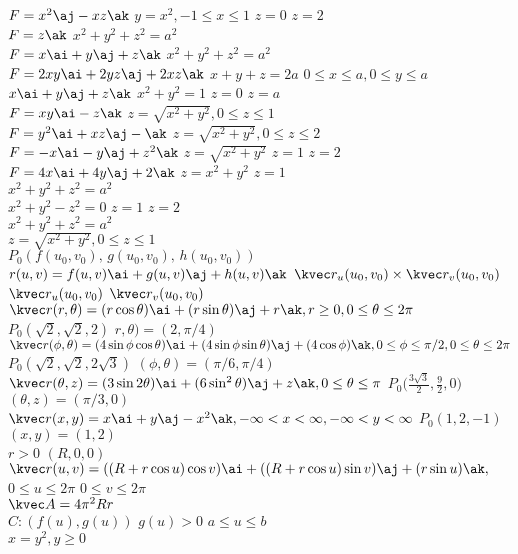 \(F=x^{2}\aj-xz\ak\)
\(y=x^{2},-1\le x\le 1\)
\(z=0\)
\(z=2\)\\
\(F=z\ak\)
\(x^{2}+y^{2}+z^{2}=a^{2}\)\\
\(F=x\ai+y\aj+z\ak\)
\(x^{2}+y^{2}+z^{2}=a^{2}\)\\
\(F=2xy\ai+2yz\aj+2xz\ak\)
\(x+y+z=2a\)
\(0\le x\le a,0\le y\le a\)\\
\(x\ai+y\aj+z\ak\)
\(x^{2}+y^{2}=1\)
\(z=0\)
\(z=a\)\\
\(F=xy\ai-z\ak\)
\(z=\sqrt{x^{2}+y^{2}},0\le z\le 1\)\\
\(F=y^{2}\ai+xz\aj-\ak\)
\(z=\sqrt{x^{2}+y^{2}},0\le z\le 2\)\\
\(F=-x\ai-y\aj+z^{2}\ak\)
\(z=\sqrt{x^{2}+y^{2}}\)
\(z=1\)
\(z=2\)\\
\(F=4x\ai+4y\aj+2\ak\)
\(z=x^{2}+y^{2}\)
\(z=1\)\\
\(x^{2}+y^{2}+z^{2}=a^{2}\)\\
\(x^{2}+y^{2}-z^{2}=0\)
\(z=1\)
\(z=2\)\\
\(x^{2}+y^{2}+z^{2}=a^{2}\)\\
\(z=\sqrt{x^{2}+y^{2}},0\le z\le 1\)\\
\(P_0(f(u_0,v_0),\,g(u_0,v_0),\,h(u_0,v_0))\)
\(r(u,v)=f(u,v)\ai+g(u,v)\aj+h(u,v)\ak\)
\(\kvec r_u(u_0,v_0)\times\kvec r_v(u_0,v_0)\)
\(\kvec r_u(u_0,v_0)\)
\(\kvec r_v(u_0,v_0)\)\\
\(\kvec r(r,\theta)=(r\cos \theta)\ai+(r\sin \theta)\aj+r\ak,r\ge 0,0\le \theta\le 2\pi\)
\(P_0(\sqrt{2},\sqrt{2},2)\)
\(r,\theta)=(2,\pi/4)\)\\
\(\kvec r(\phi,\theta)=(4\sin \phi \cos \theta)\ai+(4\sin \phi \sin \theta)\aj+(4\cos \phi)\ak,0\le \phi\le \pi/2,0\le \theta\le 2\pi\)
\(P_0(\sqrt{2},\sqrt{2},2\sqrt{3})\)
\((\phi,\theta)=(\pi/6,\pi/4)\)\\
\(\kvec r(\theta,z)=(3\sin 2\theta)\ai+(6\sin^{2} \theta)\aj+z\ak,0\le \theta\le \pi\)
\(P_0\big(\frac{3\sqrt{3}}{2},\frac{9}{2},0\big)\)
\((\theta,z)=(\pi/3,0)\)\\
\(\kvec r(x,y)=x\ai+y\aj-x^{2}\ak,-\infty<x<\infty,-\infty<y<\infty\)
\(P_0(1,2,-1)\)
\((x,y)=(1,2)\)\\
\(r>0\)
\((R,0,0)\)
\(\kvec r(u,v)=((R+r\cos u)\cos v)\ai+((R+r\cos u)\sin v)\aj+(r\sin u)\ak,\)
\(0\le u\le 2\pi\)
\(0\le v\le 2\pi\)\\
\(\kvec A=4\pi^{2}Rr\)\\
\(C:(f(u),g(u))\)
\(g(u)>0\)
\(a\le u\le b\)\\
\(x=y^{2},y\ge 0\)

